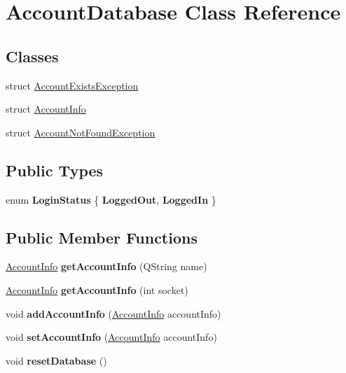 \hypertarget{classAccountDatabase}{}\section{Account\+Database Class Reference}
\label{classAccountDatabase}
\subsection*{Classes}
\begin{DoxyCompactItemize}
\item 
struct \hyperlink{structAccountDatabase_1_1AccountExistsException}{Account\+Exists\+Exception}
\item 
struct \hyperlink{structAccountDatabase_1_1AccountInfo}{Account\+Info}
\item 
struct \hyperlink{structAccountDatabase_1_1AccountNotFoundException}{Account\+Not\+Found\+Exception}
\end{DoxyCompactItemize}
\subsection*{Public Types}
\begin{DoxyCompactItemize}
\item 
\mbox{\label{classAccountDatabase_a586e317419560424b36eda71d4ebf0c9}} 
enum {\bfseries Login\+Status} \{ {\bfseries Logged\+Out}, 
{\bfseries Logged\+In}
 \}
\end{DoxyCompactItemize}
\subsection*{Public Member Functions}
\begin{DoxyCompactItemize}
\item 
\mbox{\label{classAccountDatabase_a7ec4d79ffa2fcb5bf7d1523e7c2450a5}} 
\hyperlink{structAccountDatabase_1_1AccountInfo}{Account\+Info} {\bfseries get\+Account\+Info} (Q\+String name)
\item 
\mbox{\label{classAccountDatabase_a1e25558788eaf5fa5e06be4ee0d6f3eb}} 
\hyperlink{structAccountDatabase_1_1AccountInfo}{Account\+Info} {\bfseries get\+Account\+Info} (int socket)
\item 
\mbox{\label{classAccountDatabase_a32dea5d1e714d02f887cc618ea90314c}} 
void {\bfseries add\+Account\+Info} (\hyperlink{structAccountDatabase_1_1AccountInfo}{Account\+Info} account\+Info)
\item 
\mbox{\label{classAccountDatabase_af9ecee51d63620c67f6baa15e5f7fe64}} 
void {\bfseries set\+Account\+Info} (\hyperlink{structAccountDatabase_1_1AccountInfo}{Account\+Info} account\+Info)
\item 
\mbox{\label{classAccountDatabase_ad37b1c0d68d762962c5ec79c31d5eaeb}} 
void {\bfseries reset\+Database} ()
\end{DoxyCompactItemize}

